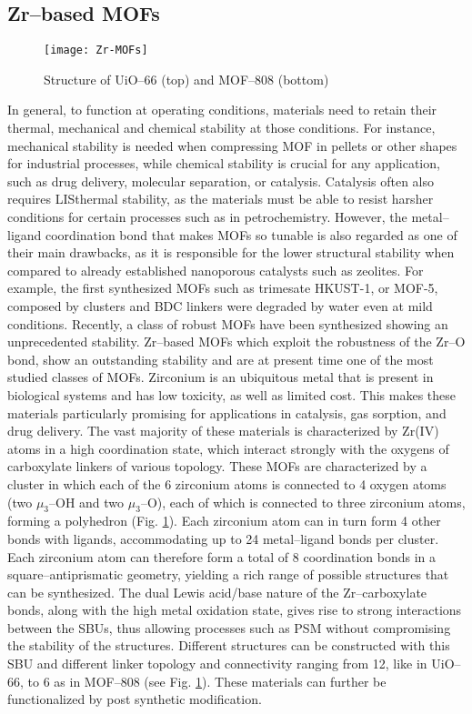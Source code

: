 \subsection{Zr--based MOFs}
\begin{figure}[!htbp]
	\centering
 	\texttt{[image: Zr-MOFs]}
	\caption{Structure of UiO--66 (top) and MOF--808 (bottom)}
	\label{fig:Zr-MOFs}
\end{figure}
In general, to function at operating conditions, materials need to retain their thermal, mechanical and chemical stability at those conditions. For instance, mechanical stability is needed when compressing MOF in pellets or other shapes for industrial processes\cite{chapman2009pressure}, while chemical stability is crucial for any application, such as drug delivery, molecular separation, or catalysis\cite{horcajada2010porous}. Catalysis often also requires LISthermal stability, as the materials must be able to resist harsher conditions for certain processes such as in petrochemistry. 
However, the metal--ligand coordination bond that makes MOFs so tunable is also regarded as one of their main drawbacks\cite{keskin2010can, canivet2014water, kizzie2011effect}, as it is responsible for the lower structural stability when compared to already established nanoporous catalysts such as zeolites. For example, the first synthesized MOFs such as  trimesate HKUST-1, or MOF-5, composed by  clusters and BDC linkers were degraded by water even at mild conditions\cite{greathouse2006interaction, low2009virtual, kaye2007impact, decoste2013effect}. 
Recently, a class of robust MOFs have been synthesized showing an unprecedented stability\cite{furukawa2014water}. Zr--based MOFs\cite{bai2016zr} which exploit the robustness of the Zr--O bond, show an outstanding stability and are at present time one of the most studied classes of MOFs. Zirconium is an ubiquitous metal that is present in biological systems and has low toxicity, as well as limited cost. This makes these materials particularly promising for applications in catalysis, gas sorption, and drug delivery. The vast majority of these materials is characterized by Zr(IV) atoms in a high coordination state, which interact strongly with the oxygens of carboxylate linkers of various topology. These MOFs are characterized by a  cluster in which each of the 6 zirconium atoms is connected to 4 oxygen atoms (two $\mu_3$--OH and two $\mu_3$--O), each of which is connected to three zirconium atoms, forming a polyhedron (Fig. \ref{fig:Zr-MOFs}). Each zirconium atom can in turn form 4 other bonds with ligands, accommodating up to 24 metal--ligand bonds per cluster. Each zirconium atom can therefore form a total of 8 coordination bonds in a square--antiprismatic geometry, yielding a rich range of possible structures that can be synthesized. The dual Lewis acid/base nature of the Zr--carboxylate bonds, along with the high metal oxidation state, gives rise to strong interactions between the SBUs, thus allowing processes such as PSM without compromising the stability of the structures. Different structures can be constructed with this SBU and different linker topology and connectivity ranging from 12, like in UiO--66, to 6 as in MOF--808 (see Fig. \ref{fig:Zr-MOFs}). These materials can further be functionalized by post synthetic modification. 
